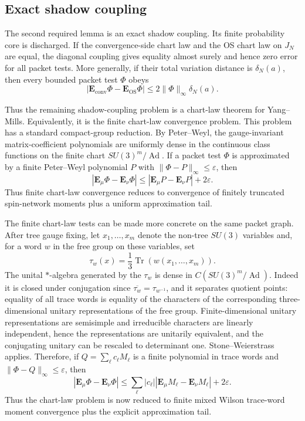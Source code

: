 \subsection{Exact shadow coupling}
The second required lemma is an exact shadow coupling. Its finite probability
core is discharged. If the convergence-side chart law and the OS chart law on
$J_N$ are equal, the diagonal coupling gives equality almost surely and hence
zero error for all packet tests. More generally, if their total variation
distance is $\delta_N(a)$, then every bounded packet test $\Phi$ obeys
\[
  \left|\mathbf E_{\mathrm{conv}}\Phi-\mathbf E_{\mathrm{OS}}\Phi\right|
  \leq 2\|\Phi\|_\infty\delta_N(a).
\]

Thus the remaining shadow-coupling problem is a chart-law theorem for
Yang--Mills. Equivalently, it is the finite chart-law convergence problem.
This problem has a standard compact-group reduction. By Peter--Weyl, the
gauge-invariant matrix-coefficient polynomials are uniformly dense in the
continuous class functions on the finite chart $SU(3)^m/\!\operatorname{Ad}$.
If a packet test $\Phi$ is approximated by a finite Peter--Weyl polynomial $P$
with $\|\Phi-P\|_\infty\leq\varepsilon$, then
\[
  \left|\mathbf E_\mu\Phi-\mathbf E_\nu\Phi\right|
  \leq \left|\mathbf E_\mu P-\mathbf E_\nu P\right|+2\varepsilon.
\]
Thus finite chart-law convergence reduces to convergence of finitely truncated
spin-network moments plus a uniform approximation tail.

The finite chart-law tests can be made more concrete on the same packet graph.
After tree gauge fixing, let $x_1,\ldots,x_m$ denote the non-tree
$SU(3)$ variables and, for a word $w$ in the free group on these variables, set
\[
  \tau_w(x)=\frac{1}{3}\operatorname{Tr}(w(x_1,\ldots,x_m)).
\]
The unital $*$-algebra generated by the $\tau_w$ is dense in
$C(SU(3)^m/\!\operatorname{Ad})$. Indeed it is closed under conjugation since
$\overline{\tau_w}=\tau_{w^{-1}}$, and it separates quotient points: equality
of all trace words is equality of the characters of the corresponding
three-dimensional unitary representations of the free group. Finite-dimensional
unitary representations are semisimple and irreducible characters are linearly
independent, hence the representations are unitarily equivalent, and the
conjugating unitary can be rescaled to determinant one.
Stone--Weierstrass applies. Therefore, if
$Q=\sum_\ell c_\ell M_\ell$ is a finite polynomial in trace words and
$\|\Phi-Q\|_\infty\leq\varepsilon$, then
\[
  \left|\mathbf E_\mu\Phi-\mathbf E_\nu\Phi\right|
  \leq
  \sum_\ell |c_\ell|
  \left|\mathbf E_\mu M_\ell-\mathbf E_\nu M_\ell\right|
  +2\varepsilon .
\]
Thus the chart-law problem is now reduced to finite mixed Wilson trace-word
moment convergence plus the explicit approximation tail.

